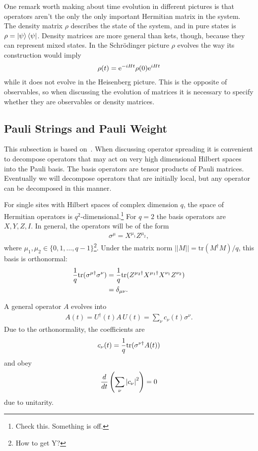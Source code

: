 One remark worth making about time evolution in different pictures is that operators aren't the only the only important Hermitian matrix in the system. The density matrix $\rho$ describes the state of the system, and in pure states is $\rho = \left|\psi\right\rangle\left\langle\psi\right|$. Density matrices are more general than kets, though, because they can represent mixed states. In the Schr\"odinger picture $\rho$ evolves the way its construction would imply
\begin{align}
\rho(t) = \text{e}^{-iHt}\rho(0)\text{e}^{iHt}
\end{align}
while it does not evolve in the Heisenberg picture. This is the opposite of observables, so when discussing the evolution of matrices it is necessary to specify whether they are observables or density matrices.

\subsection{Pauli Strings and Pauli Weight} \label{sub:pauli}

This subsection is based on~\cite{Keyserlingk}. When discussing operator spreading it is convenient to decompose operators that may act on very high dimensional Hilbert spaces into the Pauli basis. The basis operators are tensor products of Pauli matrices. Eventually we will decompose operators that are initially local, but any operator can be decomposed in this manner.

For single sites with Hilbert spaces of complex dimension $q$, the space of Hermitian operators is $q^2$-dimensional.\footnote{Check this. Something is off.} For $q=2$ the basis operators are $X, Y, Z, I$. In general, the operators will be of the form 
\begin{align}
\sigma^\mu = X^{\mu_1}Z^{\mu_2},
\end{align}
where $\mu_1, \mu_2\in\{0,1,\dots,q-1\}$\footnote{How to get Y?}. Under the matrix norm $||M|| = \text{tr}(M^\dag M)/q$, this basis is orthonormal:
\begin{align}
\frac{1}{q}\text{tr}(\sigma^{\mu\dag}\sigma^\nu) &= \frac{1}{q}\text{tr}(Z^{\mu_2\dag}
	X^{\mu_1\dag}X^{\nu_1}Z^{\nu_2})\nonumber\\
&= \delta_{\mu\nu}.\label{eqn:orthonorm}
\end{align}

A general operator $A$ evolves into
\begin{align}
A(t) = U^\dag(t)A\,U(t) = \sum_\nu c_\nu(t)\sigma^\nu.\label{eqn:decomp}
\end{align}
Due to the orthonormality, the coefficients are 
\begin{align}
c_\nu(t) = \frac{1}{q}\text{tr}(\sigma^{\nu\dag}A(t))
\end{align}
and obey 
\begin{align}
\frac{d}{dt} \left(\sum_\nu \left|c_\nu\right|^2\right) = 0 \nonumber
\end{align}
due to unitarity.

